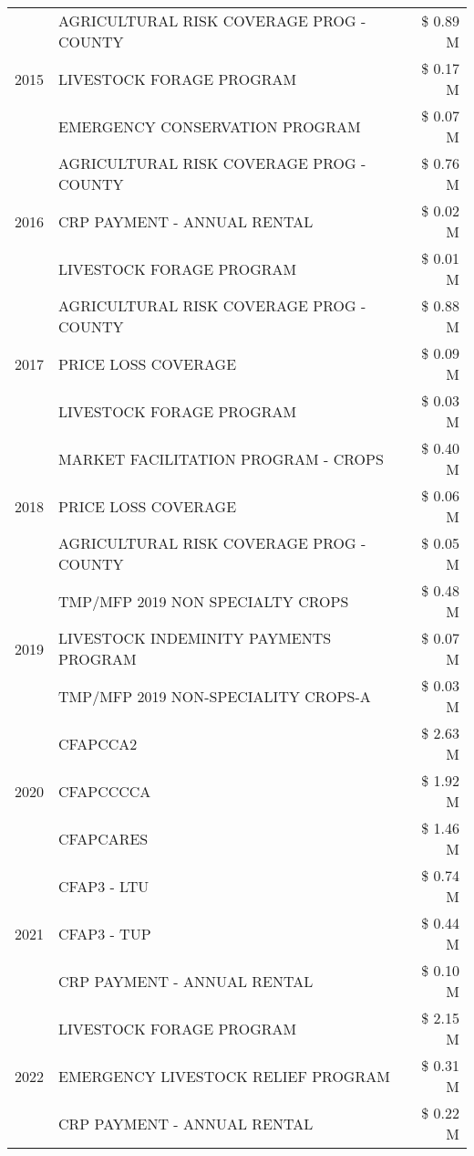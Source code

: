\begin{tabular}{llr}
\cline{1-3}
\multirow[t]{3}{*}{2015} & AGRICULTURAL RISK COVERAGE PROG - COUNTY & \$ 0.89 M \\
 & LIVESTOCK FORAGE PROGRAM & \$ 0.17 M \\
 & EMERGENCY CONSERVATION PROGRAM & \$ 0.07 M \\
\cline{1-3}
\multirow[t]{3}{*}{2016} & AGRICULTURAL RISK COVERAGE PROG - COUNTY & \$ 0.76 M \\
 & CRP PAYMENT - ANNUAL RENTAL & \$ 0.02 M \\
 & LIVESTOCK FORAGE PROGRAM & \$ 0.01 M \\
\cline{1-3}
\multirow[t]{3}{*}{2017} & AGRICULTURAL RISK COVERAGE PROG - COUNTY & \$ 0.88 M \\
 & PRICE LOSS COVERAGE & \$ 0.09 M \\
 & LIVESTOCK FORAGE PROGRAM & \$ 0.03 M \\
\cline{1-3}
\multirow[t]{3}{*}{2018} & MARKET FACILITATION PROGRAM - CROPS & \$ 0.40 M \\
 & PRICE LOSS COVERAGE & \$ 0.06 M \\
 & AGRICULTURAL RISK COVERAGE PROG - COUNTY & \$ 0.05 M \\
\cline{1-3}
\multirow[t]{3}{*}{2019} & TMP/MFP 2019 NON SPECIALTY CROPS & \$ 0.48 M \\
 & LIVESTOCK INDEMINITY PAYMENTS PROGRAM & \$ 0.07 M \\
 & TMP/MFP 2019 NON-SPECIALITY CROPS-A & \$ 0.03 M \\
\cline{1-3}
\multirow[t]{3}{*}{2020} & CFAPCCA2 & \$ 2.63 M \\
 & CFAPCCCCA & \$ 1.92 M \\
 & CFAPCARES & \$ 1.46 M \\
\cline{1-3}
\multirow[t]{3}{*}{2021} & CFAP3 - LTU & \$ 0.74 M \\
 & CFAP3 - TUP & \$ 0.44 M \\
 & CRP PAYMENT - ANNUAL RENTAL & \$ 0.10 M \\
\cline{1-3}
\multirow[t]{3}{*}{2022} & LIVESTOCK FORAGE PROGRAM & \$ 2.15 M \\
 & EMERGENCY LIVESTOCK RELIEF PROGRAM & \$ 0.31 M \\
 & CRP PAYMENT - ANNUAL RENTAL & \$ 0.22 M \\
\cline{1-3}
\bottomrule
\end{tabular}
